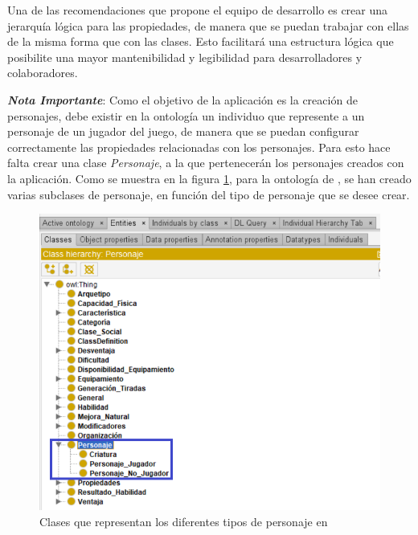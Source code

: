 Una de las recomendaciones que propone el equipo de desarrollo es crear una jerarquía lógica para las propiedades, de manera que 
se puedan trabajar con ellas de la misma forma que con las clases. Esto facilitará una estructura lógica que posibilite una 
mayor mantenibilidad y legibilidad para desarrolladores y colaboradores.\medskip 

\textit{\textbf{Nota Importante}}: Como el objetivo de la aplicación es la creación de personajes, debe existir en la ontología 
un individuo que represente a un personaje de un jugador del juego, de manera que se puedan configurar correctamente las 
propiedades relacionadas con los personajes. Para esto hace falta crear una clase \textit{Personaje}, a la que pertenecerán los 
personajes creados con la aplicación. Como se muestra en la figura \ref*{CharacterClass}, para la ontología de \anima, se han 
creado varias subclases de personaje, en función del tipo de personaje que se desee crear.

\begin{figure}[ht]
    \centering
    \includegraphics[scale=0.4]{Figures/Protege/CharacterClass.png}
    \caption{Clases que representan los diferentes tipos de personaje en \anima}
    \label{CharacterClass}
\end{figure}

